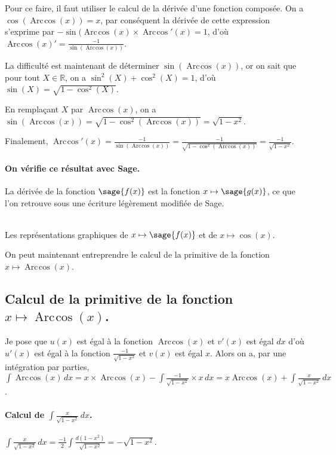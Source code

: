 \documentclass[a4paper,12pt]{report}
\def\eclaire{\mathbb}
\def\R{\ensuremath{\eclaire R}}
\renewcommand{\arccos}{\mathop{\mathrm{Arc\mspace{2mu}cos}}}
\begin{document}
Pour ce faire, il faut utiliser le calcul de la dérivée d'une fonction composée. On a $\cos(\arccos(x))=x$, par conséquent la dérivée de cette expression s'exprime par $ -\sin(\arccos(x) \times \arccos\nolimits'(x) = 1$, d'où $\arccos(x)' = \frac{-1}{\sin(\arccos(x))} $.

La difficulté est maintenant de déterminer $\sin(\arccos(x))$, or on sait que pour tout $X \in \R$, on a $\sin^2(X) + \cos^2(X) = 1$, d'où $\sin(X) = \sqrt{1-\cos^2(X)}$.

En remplaçant $X$ par $\arccos(x)$, 
on a $\sin(\arccos(x)) = \sqrt{1-\cos^2(\arccos(x))} = \sqrt{1- x^2}$.

Finalement, $\arccos\nolimits'(x) = \frac{-1}{\sin(\arccos(x))} = \frac{-1}{\sqrt{1-\cos^2(\arccos(x))}} =  \frac{-1}{\sqrt{1- x^2}} $.
\paragraph{On vérifie ce résultat avec Sage.}
La dérivée de la fonction $\sage{f(x)}$ est la fonction $x \mapsto \sage{g(x)} $, ce que l'on retrouve sous une écriture légèrement modifiée de Sage.


\begin{center}
\\
Les représentations graphiques de $x \mapsto \sage{f(x)} $ et de $x\mapsto \cos(x)$.
\end{center}

On peut maintenant entreprendre le calcul de la primitive de la  fonction  $x \mapsto \arccos(x) $.

\subsection{Calcul de la primitive de la fonction  $x \mapsto \arccos(x) $.}
Je pose que $u(x)$  est égal à la fonction $\arccos(x)$ et $v'(x)$ est égal $dx$  d'où $u'(x)$  est égal à la fonction $ \frac{-1}{\sqrt{1- x^2}} $ et $v(x)$ est égal $x$.
Alors on a, par une intégration par parties, $\int \arccos(x) \, dx = x \times \arccos(x) -\int \frac{-1}{\sqrt{1- x^2}} \times x \, dx =  x \arccos(x) + \int \frac{x}{\sqrt{1- x^2}} \, dx $.
\paragraph{Calcul de $\int \frac{x}{\sqrt{1- x^2}} \, dx $.}
$\int \frac{x}{\sqrt{1- x^2}} \, dx = \frac{-1}{2} \int \frac{d(1-x^2)}{\sqrt{1- x^2}}= -\sqrt{1- x^2} $.
\end{document}
